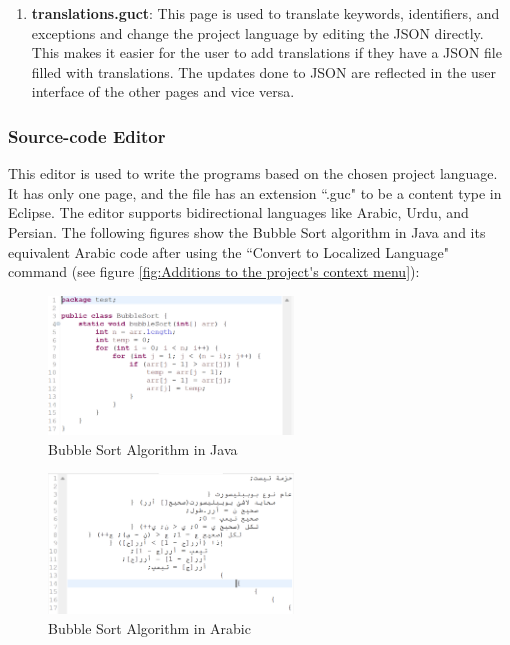 \begin{enumerate}
    \item \textbf{translations.guct}: This page is used to translate keywords, identifiers, and exceptions and change the project language by editing the JSON directly. This makes it easier for the user to add translations if they have a JSON file filled with translations. The updates done to JSON are reflected in the user interface of the other pages and vice versa.

\end{enumerate}

\subsubsection{Source-code Editor}
This editor is used to write the programs based on the chosen project language. It has only one page, and the file has an extension ``.guc" to be a content type in Eclipse. The editor supports bidirectional languages like Arabic, Urdu, and Persian. The following figures show the Bubble Sort algorithm in Java and its equivalent Arabic code after using the ``Convert to Localized Language" command (see figure \ref{fig:Additions to the project's context menu}): 

    \begin{figure}[H]
    \centering
    \includegraphics[width=6.5cm]{ch3-images/bubblesort.png}
    \caption{Bubble Sort Algorithm in Java}
    \label{fig:Bubble Sort Algorithm in Java}
    \end{figure}

    \begin{figure}[H]
    \centering
    \includegraphics[width=6.5cm]{ch3-images/bubblesort_ar.png}
    \caption{Bubble Sort Algorithm in Arabic}
    \label{fig:Bubble Sort Algorithm in Arabic}
    \end{figure}


